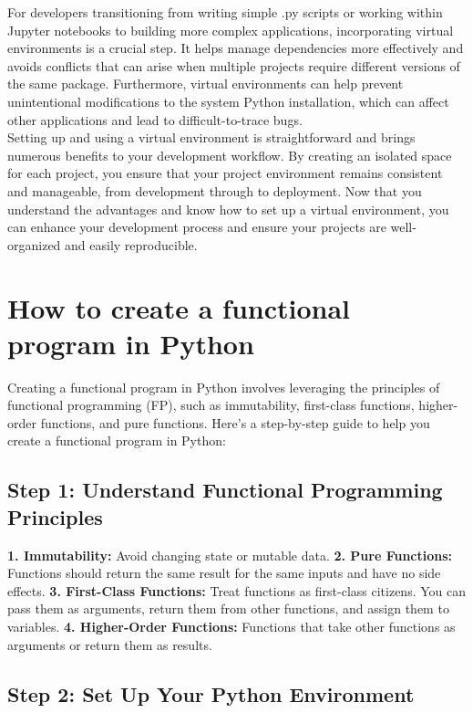 \documentclass[12pt]{article}
\begin{document}
For developers transitioning from writing simple .py scripts or working within Jupyter notebooks to building more complex applications, incorporating virtual environments is a crucial step. It helps manage dependencies more effectively and avoids conflicts that can arise when multiple projects require different versions of the same package. Furthermore, virtual environments can help prevent unintentional modifications to the system Python installation, which can affect other applications and lead to difficult-to-trace bugs.\\

Setting up and using a virtual environment is straightforward and brings numerous benefits to your development workflow. By creating an isolated space for each project, you ensure that your project environment remains consistent and manageable, from development through to deployment. Now that you understand the advantages and know how to set up a virtual environment, you can enhance your development process and ensure your projects are well-organized and easily reproducible.\\

\section{How to create a functional program in Python}
Creating a functional program in Python involves leveraging the principles of functional programming (FP), such as immutability, first-class functions, higher-order functions, and pure functions. Here's a step-by-step guide to help you create a functional program in Python:

\subsection{Step 1: Understand Functional Programming Principles}
\textbf{1. Immutability:} Avoid changing state or mutable data.
\textbf{2. Pure Functions:} Functions should return the same result for the same inputs and have no side effects.
\textbf{3. First-Class Functions:} Treat functions as first-class citizens. You can pass them as arguments, return them from other functions, and assign them to variables.
\textbf{4. Higher-Order Functions:} Functions that take other functions as arguments or return them as results.

\subsection{Step 2: Set Up Your Python Environment}
\end{document}

